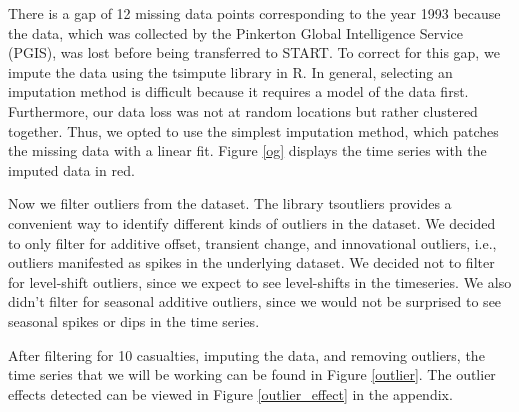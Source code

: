 \documentclass[11pt]{paper}
\begin{document}

There is a gap of 12 missing data points corresponding to the year 1993 because the data, which was collected by the Pinkerton Global Intelligence Service (PGIS), was lost before being transferred to START. To correct for this gap, we impute the data using the tsimpute library in R. In general, selecting an imputation method is difficult because it requires a model of the data first. Furthermore, our data loss was not at random locations but rather clustered together. Thus, we opted to use the simplest imputation method, which patches the missing data with a linear fit. Figure \ref{og} displays the time series with the imputed data in red.


Now we filter outliers from the dataset. The library tsoutliers provides a convenient way to identify different kinds of outliers in the dataset. We decided to only filter for additive offset, transient change, and innovational outliers, i.e., outliers manifested as spikes in the underlying dataset. We decided not to filter for level-shift outliers, since we expect to see level-shifts in the timeseries. We also didn’t filter for seasonal additive outliers, since we would not be surprised to see seasonal spikes or dips in the time series.

After filtering for 10 casualties, imputing the data, and removing outliers, the time series that we will be working can be found in Figure \ref{outlier}. The outlier effects detected can be viewed in Figure \ref{outlier_effect} in the appendix.
\end{document}
